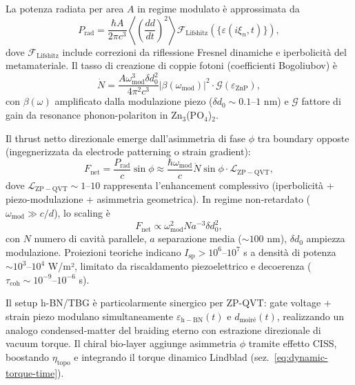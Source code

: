 \documentclass[11pt,a4paper]{article}
\let\oldref\ref
\renewcommand{\ref}{\protect\oldref}
\theoremstyle{plain}
\theoremstyle{definition}
\begin{document}
La potenza radiata per area $A$ in regime modulato è approssimata da
\begin{equation}
P_{\mathrm{rad}} = \frac{\hbar A}{2\pi c^3} \left\langle \left( \frac{dd}{dt} \right)^2 \right\rangle \mathcal{F}_{\mathrm{Lifshitz}}(\{\varepsilon(i\xi_n,t)\}),
\label{eq:zpqvt-power}
\end{equation}
dove $\mathcal{F}_{\mathrm{Lifshitz}}$ include correzioni da riflessione Fresnel dinamiche e iperbolicità del metamateriale. Il tasso di creazione di coppie fotoni (coefficienti Bogoliubov) è
\begin{equation}
\dot{N} = \frac{A \omega_{\mathrm{mod}}^3 \delta d_0^2}{4\pi^2 c^3} |\beta(\omega_{\mathrm{mod}})|^2 \cdot \mathcal{G}(\varepsilon_{\mathrm{ZnP}}),
\label{eq:zpqvt-bogoliubov}
\end{equation}
con $\beta(\omega)$ amplificato dalla modulazione piezo ($\delta d_0 \sim 0.1$--$1$ nm) e $\mathcal{G}$ fattore di gain da resonance phonon-polariton in Zn$_3$(PO$_4$)$_2$.

Il thrust netto direzionale emerge dall'asimmetria di fase $\phi$ tra boundary opposte (ingegnerizzata da electrode patterning o strain gradient):
\begin{equation}
F_{\mathrm{net}} = \frac{P_{\mathrm{rad}}}{c} \sin\phi \approx \frac{\hbar \omega_{\mathrm{mod}}}{c} \dot{N} \sin\phi \cdot \mathcal{L}_{\mathrm{ZP-QVT}},
\label{eq:zpqvt-thrust}
\end{equation}
dove $\mathcal{L}_{\mathrm{ZP-QVT}} \sim 1$--$10$ rappresenta l'enhancement complessivo (iperbolicità + piezo-modulazione + asimmetria geometrica). In regime non-retardato ($\omega_{\mathrm{mod}} \gg c/d$), lo scaling è
\begin{equation}
F_{\mathrm{net}} \propto \omega_{\mathrm{mod}}^2 N a^{-3} \delta d_0^2,
\label{eq:zpqvt-scaling}
\end{equation}
con $N$ numero di cavità parallele, $a$ separazione media ($\sim 100$ nm), $\delta d_0$ ampiezza modulazione. Proiezioni teoriche indicano $I_{\mathrm{sp}} > 10^6$--$10^7$ s a densità di potenza $\sim 10^3$--$10^4$ W/m², limitato da riscaldamento piezoelettrico e decoerenza ($\tau_{\mathrm{coh}} \sim 10^{-9}$--$10^{-6}$ s).

Il setup h-BN/TBG è particolarmente sinergico per ZP-QVT: gate voltage + strain piezo modulano simultaneamente $\varepsilon_{\mathrm{h-BN}}(t)$ e $d_{\mathrm{moiré}}(t)$, realizzando un analogo condensed-matter del braiding eterno con estrazione direzionale di vacuum torque. Il chiral bio-layer aggiunge asimmetria $\phi$ tramite effetto CISS, boostando $\eta_{\mathrm{topo}}$ e integrando il torque dinamico Lindblad (sez.~\ref{eq:dynamic-torque-time}).
\end{document}
